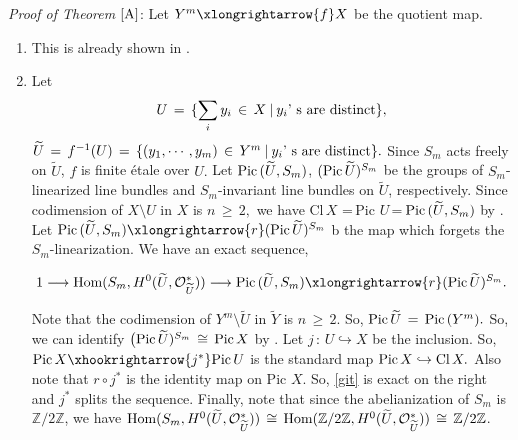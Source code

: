 \documentclass[12pt,reqno]{amsart}
\theoremstyle{definition}
\numberwithin{equation}{section}
\begin{document}
\textit{Proof of Theorem $\ref{A}$}: Let $ Y^{m} \xlongrightarrow{f} X $  be the quotient map.
\begin{enumerate}
\item[$(i)$] This is already shown in \cite{Fo}.
\item[$(ii)$] Let 
\begin{equation*}
 U\,=\, \{ \sum_{i}y_{i}\,\in\, X \medspace | \medspace y_{i} \textnormal{' s are distinct} \},
\end{equation*}
  $\widetilde{U}\,=\, f^{-1}(U)\,=\, \{(y_{1},\cdots, y_{m})\,\in\, Y^m \medspace | \medspace y_{i}\textnormal{' s are distinct} \} .$ Since $S_m$ acts freely on $\widetilde{U}$, $f$ is finite {\'e}tale over $U.$ Let  $\textnormal{Pic}\,(\widetilde{U},S_{m})$, $(\textnormal{Pic}\, \widetilde{U})^{S_{m}}$ be the groups of $S_m$-linearized line bundles and $S_m$-invariant line bundles on $\widetilde{U}$, respectively. Since codimension of $ X\setminus U$ in $ X$ is $n\, \geq\, 2,$ we have Cl$\,X\,$\,=\,Pic $U$\,=\,$\textnormal{Pic}\,(\widetilde{U},S_{m})$ by {\cite[Chapter 2, Section 7, Proposition 2]{mumford1974abelian}}. Let $\textnormal{Pic}\,(\widetilde{U},S_{m})\xlongrightarrow{r} (\textnormal{Pic}\, \widetilde{U})^{S_{m}}$ b the map which forgets the $S_m$-linearization. We have an exact sequence,

\begin{equation}\label{git}
    1 \longrightarrow \textnormal{Hom}(S_{m},H^{0}(\widetilde{U}, \mathcal{O}_{\widetilde{U}}^{\ast})) \longrightarrow \textnormal{Pic}\,(\widetilde{U},S_{m})\xlongrightarrow{r} (\textnormal{Pic}\, \widetilde{U})^{S_{m}}.
 \end{equation}

 
Note that the codimension of $ Y^{m}\setminus \widetilde{U}$ in $ \widetilde{Y}$ is $n \,\geq\, 2.$
So, $ \textnormal{Pic}\,\widetilde{U}\,=\, \textnormal{Pic}\,(Y^{m}).$ So, we can identify $ \big(\textnormal{Pic}\, \widetilde{U})^{S_{m}} \,\cong\, \textnormal{Pic}\, X$ by {\cite[Lemma 3.5 and Proposition 3.6]{Fo}}. Let $ j\,:\, U\hookrightarrow X$ be the inclusion. So, $ \textnormal{Pic}\,X \xhookrightarrow{j^*} \textnormal{Pic}\, U $ is the standard map $ \textnormal{Pic}\, X \hookrightarrow  \textnormal{Cl}\, X.$ Also note that $r\circ j^*$ is the identity map on Pic $X$. So, \eqref{git} is exact on the right and $j^* $ splits the sequence. Finally, note that since the abelianization of $S_m$ is $\mathbb{Z}/2 \mathbb{Z}$, we have $\textnormal{Hom}(S_{m},H^{0}(\widetilde{U}, \mathcal{O}_{\widetilde{U}}^{\ast}))\,\cong\, \textnormal{Hom}(\mathbb{Z}/2 \mathbb{Z},H^{0}(\widetilde{U}, \mathcal{O}_{\widetilde{U}}^{\ast}))\,\cong\, \mathbb{Z}/2 \mathbb{Z}$.
\end{enumerate}
\end{document}
